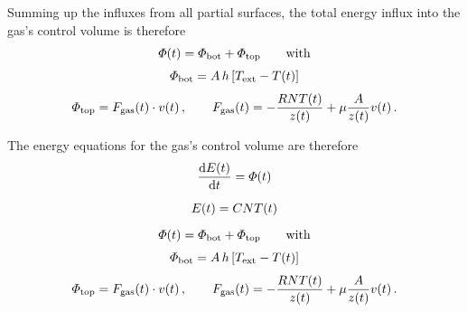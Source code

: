 \documentclass[a4paper,12pt,%
onecolumn,oneside,%
british%
]{memoir}
\newcommand*{\di}{\mathop{}\!\mathrm{d}}%
\renewcommand*{\|}[1][]{\nonscript\:#1\vert\nonscript\:\mathopen{}}
\newcommand*{\yvis}{\mu} %
\newcommand*{\yhea}{h} %
\newcommand*{\dt}{\di t}
\newcommand*{\yN}{N}
\newcommand*{\yE}{E}
\newcommand*{\yH}{\varPhi}%
\newcommand*{\yFgas}{F_{\textrm{gas}}}
\newcommand*{\yFatm}{F_{\textrm{atm}}}
\newcommand*{\yT}{T}%
\newcommand*{\yTe}{\yT_{\text{ext}}}%
\begin{document}
\medskip

Summing up the influxes from all partial surfaces, the total energy influx into the gas's control volume is therefore
\begin{equation}
  \label{eq:gas_energy_influx}
  \begin{gathered}
    \yH(t) = \yH_{\textrm{bot}} + \yH_{\textrm{top}}
    \qquad\text{with}
    \\[\jot]
    \yH_{\textrm{bot}} = A\,\yhea\,[\yTe-\yT(t)]
    \\[\jot]
    \yH_{\textrm{top}} =  \yFgas(t) \cdot v(t) \,,
    \qquad
      \yFgas(t) = -\frac{R \yN \yT(t)}{z(t)}  + \yvis \frac{A}{z(t)} v(t)
    \,.
  \end{gathered}
\end{equation}

\medskip

The energy equations for the gas's control volume are therefore
\begin{equation}
  \label{eq:gas_equations}
  \begin{gathered}
  \frac{\di \yE(t)}{\dt} = \yH(t)
  \\[2\jot]
    \yE(t) = C\yN\yT(t)
    \\[2\jot]
    \yH(t) = \yH_{\textrm{bot}} + \yH_{\textrm{top}}
    \qquad\text{with}
    \\[\jot]
    \yH_{\textrm{bot}} = A\,\yhea\,[\yTe-\yT(t)]
    \\[\jot]
    \yH_{\textrm{top}} =  \yFgas(t) \cdot v(t) \,,
    \qquad
      \yFgas(t) = -\frac{R \yN \yT(t)}{z(t)}  + \yvis \frac{A}{z(t)} v(t) \,.
  \end{gathered}
\end{equation}

\vspace{2\bigskipamount}
\end{document}
